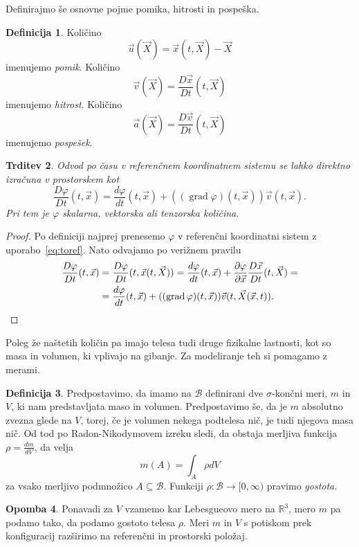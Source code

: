 \documentclass[12pt,a4paper,twoside]{article}
\theoremstyle{definition} %
\newtheorem{definicija}{Definicija}[section]
\newtheorem{opomba}[definicija]{Opomba}
\theoremstyle{plain} %
\newtheorem{trditev}[definicija]{Trditev}
\numberwithin{equation}{section}
\newcommand{\R}{\mathbb R}
\newcommand{\B}{\mathcal{B}}
\newcommand{\grad}{\operatorname{grad}}
\renewcommand{\phi}{\varphi}
\newcommand{\dpar}[2]{\ensuremath{\frac{\partial #1}{\partial #2}}}
\newcommand{\dd}[2]{\ensuremath{\frac{d #1}{d #2}}}
\newcommand{\ddt}[1]{\dd{#1}{t}}
\newcommand{\DD}[2]{\ensuremath{\frac{D #1}{D #2}}}
\newcommand{\DDt}[1]{\DD{#1}{t}}
\newcommand{\vv}{\vec{v}}
\newcommand{\vu}{\vec{u}}
\newcommand{\va}{\vec{a}}
\newcommand{\vX}{\vec{X}}
\newcommand{\vx}{\vec{x}}
\begin{document}
Definirajmo še osnovne pojme pomika, hitrosti in pospeška.
\begin{definicija}
  Količino \begin{equation} \vu(\vX) = \vx(t, \vX) - \vX \end{equation} imenujemo \emph{pomik}.
  Količino \begin{equation} \vv(\vX) = \DDt{\vx}(t, \vX) \end{equation} imenujemo \emph{hitrost}.
  Količino \begin{equation} \va(\vX) = \DDt{\vv}(t, \vX) \end{equation} imenujemo \emph{pospešek}.
\end{definicija}
\begin{trditev}
  Odvod po času v referenčnem koordinatnem sistemu se lahko direktno izračuna v
  prostorskem kot
  \begin{equation}
    \DDt{\phi}(t, \vx) = \ddt{\phi}(t, \vx) + ((\grad \phi)(t, \vx)) \vv(t, \vx).
  \end{equation}
  Pri tem je $\phi$ skalarna, vektorska ali tenzorska količina.
\end{trditev}
\begin{proof}
  Po definiciji najprej prenesemo $\phi$ v referenčni koordinatni sistem z
  uporabo~\ref{eq:toref}. Nato odvajamo po verižnem pravilu
  \begin{align*}
    \DDt \phi(t, \vx) &= \DDt \phi(t, \vx(t, \vX)) =
    \ddt \phi(t, \vx) + \dpar{\phi}{\vx} \DDt{\vx} (t, \vX) = \\ \nonumber
    &= \ddt \phi(t, \vx) + ((\grad \phi)(t, \vx)) \vv(t, \vX(\vx, t)). \qedhere
  \end{align*}
\end{proof}

Poleg že naštetih količin pa imajo telesa tudi druge fizikalne lastnosti, kot so
masa in volumen, ki vplivajo na gibanje. Za modeliranje teh si pomagamo z
merami.

\begin{definicija}
  Predpostavimo, da imamo na $\B$ definirani dve $\sigma$-končni meri, $m$ in $V$, ki nam
  predstavljata maso in volumen. Predpostavimo še, da je $m$ absolutno zvezna glede na $V$, torej,
  če je volumen nekega podtelesa nič, je tudi njegova masa nič. Od tod po Radon-Nikodymovem izreku
  sledi, da obstaja merljiva funkcija $\rho =
  \dd{m}{V}$, da velja
  \begin{equation}
    m(A) = \int_{A} \rho dV
  \end{equation}
  za vsako merljivo podmnožico $A \subseteq \B$.
  Funkciji $\rho\colon\B\to[0, \infty)$ pravimo \emph{gostota}.
\end{definicija}
\begin{opomba}
  Ponavadi za $V$ vzamemo kar Lebesgueovo mero na $\R^3$, mero $m$ pa podamo tako, da
  podamo gostoto telesa $\rho$. Meri $m$ in $V$ s potiskom prek konfiguracij
  razširimo na referenčni in prostorski položaj.
\end{opomba}
\end{document}
